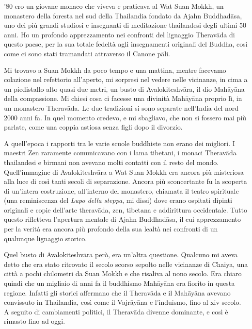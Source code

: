 
 '80 ero un giovane monaco che viveva e praticava al Wat Suan Mokkh, un monastero della foresta nel sud della Thailandia fondato da Ajahn Buddhadāsa, uno dei più grandi studiosi e insegnanti di meditazione thailandesi degli ultimi 50 anni. Ho un profondo apprezzamento nei confronti del lignaggio Theravāda di questo paese, per la sua totale fedeltà agli insegnamenti originali del Buddha, così come ci sono stati tramandati attraverso il Canone pāli.

Mi trovavo a Suan Mokkh da poco tempo e una mattina, mentre facevamo colazione nel refettorio all'aperto, mi sorpresi nel vedere nelle vicinanze, in cima a un piedistallo alto quasi due metri, un busto di Avalokiteshvāra, il dio Mahāyāna della compassione. Mi chiesi cosa ci facesse una divinità Mahāyāna proprio lì, in un monastero Theravāda. Le due tradizioni si sono separate nell'India del nord 2000 anni fa. In quel momento credevo, e mi sbagliavo, che non si fossero mai più parlate, come una coppia astiosa senza figli dopo il divorzio. 

A quell'epoca i rapporti tra le varie scuole buddhiste non erano dei migliori. I maestri Zen raramente comunicavano con i lama tibetani, i monaci Theravāda thailandesi e birmani non avevano molti contatti con il resto del mondo. Quell'immagine di Avalokiteshvāra a Wat Suan Mokkh era ancora più misteriosa alla luce di così tanti secoli di separazione. Ancora più sconcertante fu la scoperta di un'intera costruzione, all'interno del monastero, chiamata il teatro spirituale (una reminiscenza del \textit{Lupo della steppa}, mi dissi) dove erano ospitati dipinti originali e copie dell'arte theravāda, zen, tibetana e addirittura occidentale. Tutto questo rifletteva l'apertura mentale di Ajahn Buddhadāsa, il cui apprezzamento per la verità era ancora più profondo della sua lealtà nei confronti di un qualunque lignaggio storico.

Quel busto di Avalokiteshvāra però, era un'altra questione. Qualcuno mi aveva detto che era stato ritrovato il secolo scorso sepolto nelle vicinanze di Chaiya, una città a pochi chilometri da Suan Mokkh e che risaliva al nono secolo. Era chiaro quindi che un migliaio di anni fa il buddhismo Mahāyāna era fiorito in questa regione. Infatti gli storici affermano che il Theravāda e il Mahāyāna avevano convissuto in Thailandia, così come il Vajrāyāna e l'induismo, fino al xiv secolo. A seguito di cambiamenti politici, il Theravāda divenne dominante, e così è rimasto fino ad oggi.

